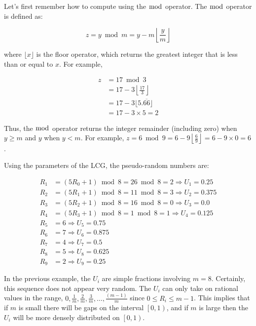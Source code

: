 \documentclass[
]{book}
\theoremstyle{definition}
\theoremstyle{definition}
\theoremstyle{definition}
\theoremstyle{definition}
\theoremstyle{remark}
\begin{document}
Let's first remember how to compute using the \(\bmod\) operator. The
\(\bmod\) operator is defined as:

\[
z = y \bmod m = y - m \left \lfloor \dfrac{y}{m} \right \rfloor
\]

where \(\lfloor x \rfloor\) is the floor operator, which returns the
greatest integer that is less than or equal to \(x\). For example,

\begin{equation}
\begin{split}
z & = 17 \bmod 3 \\
  & = 17 - 3 \left \lfloor \frac{17}{3} \right \rfloor \\
  & = 17 - 3 \lfloor 5.\overline{66} \rfloor \\
  & = 17 - 3 \times 5 = 2
\end{split}
\end{equation}

Thus, the \(\bmod\) operator returns the integer remainder (including zero) when \(y \geq m\) and \(y\) when \(y < m\). For example,
\(z = 6 \bmod 9 = 6 - 9 \left\lfloor \frac{6}{9} \right\rfloor = 6 - 9 \times 0 = 6\).

Using the parameters of the LCG, the pseudo-random numbers are:

\[
\begin{split}
  {R_1} & = (5{R_0} + 1)\bmod 8 = 26\bmod 8 = 2 \Rightarrow {U_1} = 0.25  \\
  {R_2} & =  (5{R_1} + 1)\bmod 8 = 11\bmod 8 = 3 \Rightarrow {U_2} = 0.375  \\
  {R_3} & =  (5{R_2} + 1)\bmod 8 = 16\bmod 8 = 0 \Rightarrow {U_3} = 0.0  \\
  {R_4} & =  (5{R_3} + 1)\bmod 8 = 1\bmod 8 = 1 \Rightarrow {U_4} = 0.125  \\
  {R_5} & =  6 \Rightarrow {U_5} = 0.75 \\
  {R_6} & =  7 \Rightarrow {U_6} = 0.875 \\
  {R_7} & =  4 \Rightarrow {U_7} = 0.5 \\
  {R_8} & =  5 \Rightarrow {U_8} = 0.625 \\
  {R_9} & =  2 \Rightarrow {U_9} = 0.25
\end{split}
\]

In the previous example, the \(U_{i}\) are simple fractions involving
\(m = 8\). Certainly, this sequence does not appear very random. The
\(U_{i}\) can only take on rational values in the range,
\(0,\tfrac{1}{m}, \tfrac{2}{m}, \tfrac{3}{m}, \ldots, \tfrac{(m-1)}{m}\)
since \(0 \leq R_{i} \leq m-1\). This implies that if \(m\) is small there
will be gaps on the interval \(\left[0,1\right)\), and if \(m\) is large
then the \(U_{i}\) will be more densely distributed on \(\left[0,1\right)\).
\end{document}

